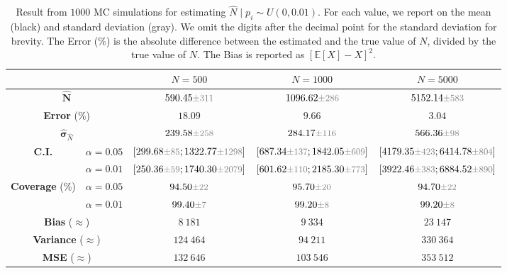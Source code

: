 \documentclass{article}
\newcommand{\variance}[1]{\ensuremath{\text{\small \textcolor{gray}{$\pm #1$}}}}
\begin{document}
\begin{table}[t]
    \centering 
    \caption*{$p_i \sim U(0, 0.01)$}
    \begin{tabular}{c c|c c c}
        \toprule
        & & \multicolumn{1}{|c|}{${N}=500$} & \multicolumn{1}{c|}{${N}=1000$} & \multicolumn{1}{c}{${N}=5000$} \\
        \midrule
        \multicolumn{2}{c|}{${\hat{\mathbf{N}}}$} & $590.45 \variance{311}$ & $1096.62 \variance{286}$ & $5152.14 \variance{583}$  \\
        \multicolumn{2}{c|}{\textbf{Error} (\%)} & $18.09$ & $9.66$ & $3.04$ \\
        \multicolumn{2}{c|}{${\hat{\mathbf{\sigma}}}_{\hat{N}}$} & $239.58 \variance{258}$ & $284.17 \variance{116}$ & $566.36 \variance{98}$\\
        \multirow{2}{*}{\textbf{C.I.}} & $\alpha = 0.05$ & $[299.68 \variance{85}; 1322.77 \variance{1298}]$ & $[687.34 \variance{137}; 1842.05 \variance{609}]$ & $[4179.35 \variance{423}; 6414.78 \variance{804}]$
        \\
        & $\alpha = 0.01$ & $[250.36 \variance{59}; 1740.30 \variance{2079}]$ & $[601.62 \variance{110}; 2185.30 \variance{773}]$ & $[3922.46 \variance{383}; 6884.52 \variance{890}]$ \\
        \midrule
        \multirow{2}{*}{\textbf{Coverage} (\%)} & $\alpha = 0.05$ & $94.50 \variance{22}$ & $95.70 \variance{20}$ & $94.70 \variance{22}$ \\
        & $\alpha = 0.01$ & $99.40 \variance{7}$ & $99.20 \variance{8}$ & $99.20 \variance{8}$ \\
        \multicolumn{2}{c|}{\textbf{Bias} ($\approx$)} & $8\ 181$ & $9\ 334$ & $23\ 147$ \\
        \multicolumn{2}{c|}{\textbf{Variance} ($\approx$)} & $124\ 464$ & $94\ 211$ & $330\ 364$ \\
        \multicolumn{2}{c|}{\textbf{MSE} ($\approx$)} & $132\ 646$ & $103\ 546$ & $353\ 512$ \\
        \bottomrule
    \end{tabular}
    \caption{Result from $1000$ MC simulations for estimating $\hat{N} \mid p_i \sim U(0, 0.01)$. For each value, we report on the mean (black) and standard deviation (gray). We omit the digits after the decimal point for the standard deviation for brevity.
    The Error (\%) is the absolute difference between the estimated and the true value of $N$, divided by the true value of $N$. The Bias is reported as ${\left[ \mathbb{E}[X] - X \right]}^2$.}
    \label{tab:problem_2_results_uniform_0_01}
\end{table}
\end{document}
